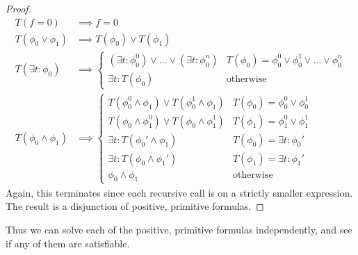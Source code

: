\begin{proof}
  \begin{align*}
    T(f = 0) &\implies f = 0 \\
    T(\phi_{0} \lor \phi_{1}) &\implies T(\phi_{0}) \lor T(\phi_{1}) \\
    T(\exists t : \phi_{0}) &\implies \begin{cases}
                                        (\exists t : \phi_{0}^{0}) \lor \dots \lor (\exists t : \phi_{0}^{n}) & T(\phi_{0}) = \phi_{0}^{0} \lor \phi_{0}^{1} \lor \dots \lor \phi_{0}^{n} \\
                                        \exists t : T(\phi_{0}) & \text{otherwise}
                                      \end{cases} \\
    T(\phi_{0} \land \phi_{1}) &\implies \begin{cases}
                                             T(\phi_{0}^{0} \land \phi_{1}) \lor T(\phi_{0}^{1} \land \phi_{1}) & T(\phi_{0}) = \phi_{0}^{0} \lor \phi_{0}^{1} \\
                                             T(\phi_{0} \land \phi_{1}^{0}) \lor T(\phi_{0} \land \phi_{1}^{1}) & T(\phi_{1}) = \phi_{1}^{0} \lor \phi_{1}^{1} \\
                                             \exists t : T(\phi_{0}' \land \phi_{1}) & T(\phi_{0}) = \exists t : \phi_{0}' \\
                                             \exists t : T(\phi_{0} \land \phi_{1}') & T(\phi_{1}) = \exists t : \phi_{1}' \\
                                             \phi_{0} \land \phi_{1} & \text{otherwise}
                                           \end{cases}
  \end{align*}
  Again, this terminates since each recursive call is on a strictly smaller expression. The result is a disjunction of positive, primitive formulas.
\end{proof}

Thus we can solve each of the positive, primitive formulas independently, and see if any of them are satisfiable.


